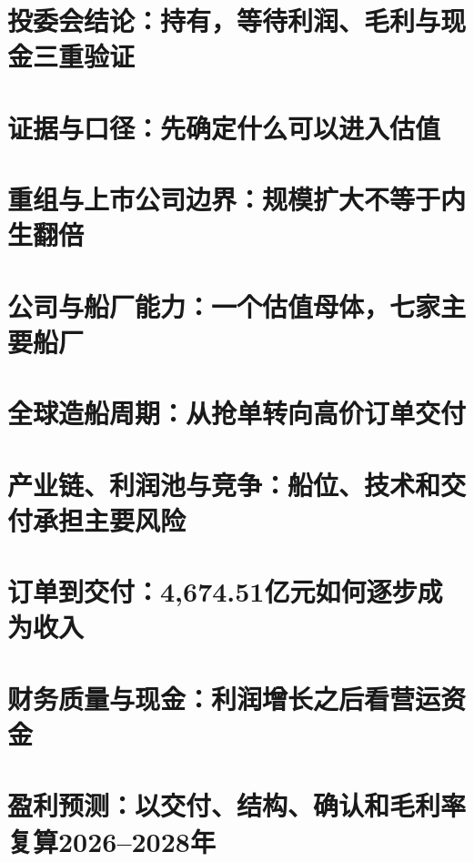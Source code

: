 \documentclass[a4paper,11pt,openany,fontset=none]{ctexrep}
\begin{document}
\astockcover


\tableofcontents
\clearpage
{}

\chapter{投委会结论：持有，等待利润、毛利与现金三重验证}


\chapter{证据与口径：先确定什么可以进入估值}


\chapter{重组与上市公司边界：规模扩大不等于内生翻倍}


\chapter{公司与船厂能力：一个估值母体，七家主要船厂}


\chapter{全球造船周期：从抢单转向高价订单交付}


\chapter{产业链、利润池与竞争：船位、技术和交付承担主要风险}


\chapter{订单到交付：4,674.51亿元如何逐步成为收入}


\chapter{财务质量与现金：利润增长之后看营运资金}


\chapter{盈利预测：以交付、结构、确认和毛利率复算2026--2028年}

\end{document}
